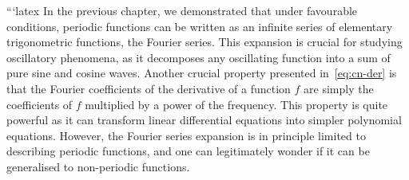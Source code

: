 ```latex
In the previous chapter, we demonstrated that under favourable conditions, periodic functions
can be written as an infinite series of elementary trigonometric functions, the Fourier
series. This expansion is crucial for studying oscillatory phenomena, as it decomposes any
oscillating function into a sum of pure sine and cosine waves. Another crucial property
presented in~\cref{eq:cn-der} is that the Fourier coefficients of the derivative of a
function $f$ are simply the coefficients of $f$ multiplied by a power of the frequency.
This property is quite powerful as it can transform linear differential equations into
simpler polynomial equations. However, the Fourier series expansion is in principle
limited to describing periodic functions, and one can legitimately wonder if it can be
generalised to non-periodic functions.


